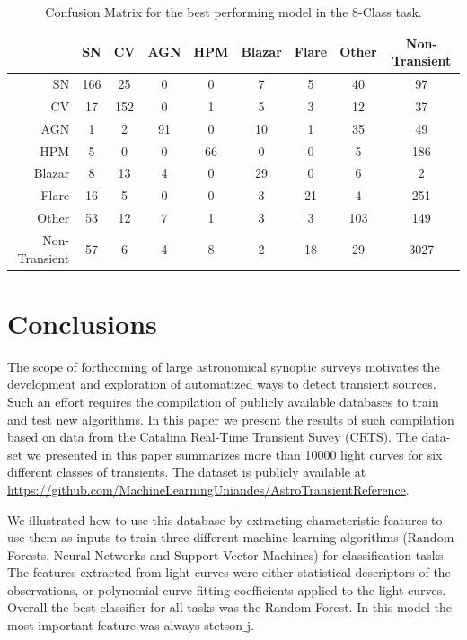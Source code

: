 \documentclass[a4paper,fleqn,usenatbib]{mnras}
\begin{document}
\begin{table}
\centering
\begin{tabular}{|r|c|c|c|c|c|c|c|c|}
\hline
\multicolumn{1}{|l|}{} & SN    & CV    & AGN   & HPM   & Blazar   & Flare   & Other   & Non-Transient  \\ \hline \hline
SN            & 166  &  25  &  0  &  0  &  7   &  5  &  40 &   97 \\ \hline
CV            &  17  & 152  &  0  &  1  &  5   &  3  &  12 &   37 \\ \hline
AGN           &   1  &   2  & 91  &  0  & 10   &  1  &  35 &   49 \\ \hline
HPM           &   5  &   0  &  0  & 66  &  0   &  0  &   5 &  186 \\ \hline
Blazar        &   8  &  13  &  4  &  0  & 29   &  0  &   6 &    2 \\ \hline
Flare         &  16  &   5  &  0  &  0  &  3   & 21  &   4 &  251 \\ \hline
Other         &  53  &  12  &  7  &  1  &  3   &  3  & 103 &  149 \\ \hline
Non-Transient &  57  &   6  &  4  &  8  &  2   & 18  &  29 & 3027 \\ \hline
\end{tabular}
\caption{Confusion Matrix for the best performing model in the 8-Class task.}
\label{Confusion-8-Class}
\end{table}



\section{Conclusions}

The scope of forthcoming of large astronomical synoptic surveys 
motivates the development and exploration of automatized ways to
detect transient sources. 
Such an effort requires the compilation of publicly available
databases to train and test new algorithms.
In this paper we present the results of such compilation based on data
from the Catalina Real-Time Transient Suvey (CRTS).
The data-set we presented in this paper summarizes more than 10000
light curves for six different classes of transients.
The dataset is publicly available at
\url{https://github.com/MachineLearningUniandes/AstroTransientReference}.   


We illustrated how to use this database by extracting 
characteristic features to use them as inputs to train three different
machine learning algorithms (Random Forests, Neural Networks and
Support Vector Machines) for classification tasks.
The features extracted from light curves were either statistical
descriptors of the observations, or polynomial curve fitting
coefficients applied to the light curves.   
Overall the best classifier for all tasks was the Random Forest.
In this model the most important feature was always stetson$\_$j.
\end{document}
